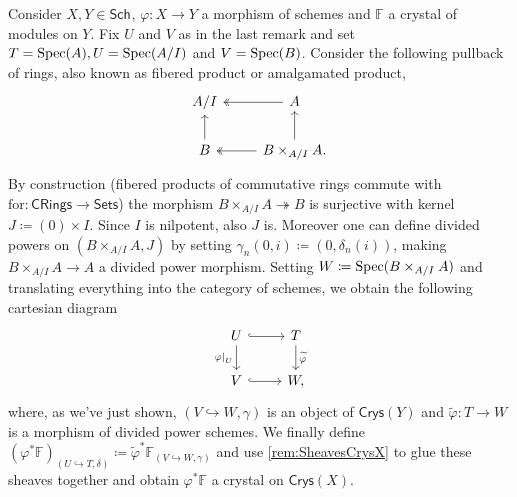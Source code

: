 \begin{defn}\label{defn:PBCrystals}
	Consider $X, Y \in \mathsf{Sch}_{  }$, $\varphi\colon X \to Y$ a morphism of schemes and
	$\mathbb{F}$ a crystal of modules on $Y$.
	Fix $U$ and $V$ as in the last remark and set
	$T = \operatorname{Spec}(A), U = \operatorname{Spec}(A/I)$
	and $V = \operatorname{Spec}(B)$.
	Consider the following pullback of rings,
	also known as fibered product or amalgamated product,
	\begin{equation*}
	\begin{tikzcd}
		A/I &
		A \arrow[l, "", twoheadrightarrow] \\
		B \arrow[u, "", rightarrow] &
		B \times_{ A/I } A
		\arrow[u, "", rightarrow] 
		\arrow[l, "", twoheadrightarrow] 
	.\end{tikzcd}
	\end{equation*}
	By construction (fibered products of commutative rings
	commute with $\mathrm{for}\colon \mathsf{CRings} \to \mathsf{Sets}$)
	the morphism $B \times_{ A/I } A \twoheadrightarrow B$ is surjective
	with kernel $J \coloneqq (0) \times I$.
	Since $I$ is nilpotent, also $J$ is.
	Moreover one can define divided powers on $\left(B \times_{ A/I } A, J\right)$
	by setting $\gamma_n(0,i) \coloneqq (0,\delta_n(i))$,
	making $B \times_{ A/I } A \to A$ a divided power morphism.
	Setting $W \coloneqq \operatorname{Spec}(B \times_{ A/I } A)$ and
	translating everything into the category of schemes, we obtain the
	following cartesian diagram
	\begin{equation*}
	\begin{tikzcd}
		U \arrow[r, "", hookrightarrow] 
		\arrow[d, "\left.\varphi\right|_{U}"', rightarrow] &
		T \arrow[d, "\widetilde{\varphi}", rightarrow] \\
		V \arrow[r, "", hookrightarrow] &
		W
	,\end{tikzcd}
	\end{equation*}
	where, as we've just shown,
	$\left(V \hookrightarrow W, \gamma\right)$ is an object of $\mathsf{Crys}(Y)$
	and $\widetilde{\varphi}\colon T \to W$ is a morphism of divided power schemes.
	We finally define $\left( \varphi^* \mathbb{F} \right)_{\left(U \hookrightarrow T, \delta\right)}
	\coloneqq \widetilde{\varphi}^* \mathbb{F}_{\left(V \hookrightarrow W, \gamma\right)}$
	and use \cref{rem:SheavesCrysX} to glue these sheaves
	together and obtain $\varphi^* \mathbb{F}$ a crystal
	on $\mathsf{Crys}(X)$.
\end{defn}



